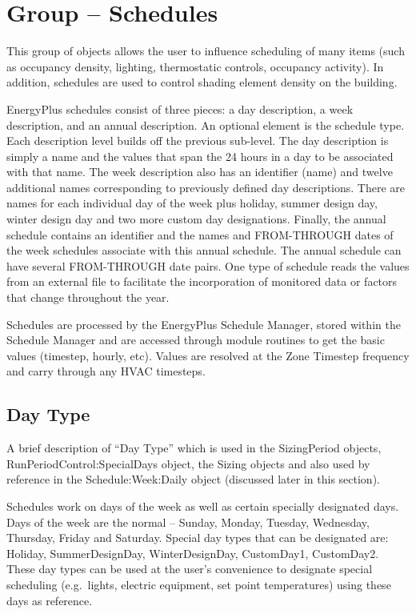 \section{Group -- Schedules}\label{group-schedules}

This group of objects allows the user to influence scheduling of many items (such as occupancy density, lighting, thermostatic controls, occupancy activity). In addition, schedules are used to control shading element density on the building.

EnergyPlus schedules consist of three pieces: a day description, a week description, and an annual description. An optional element is the schedule type. Each description level builds off the previous sub-level. The day description is simply a name and the values that span the 24 hours in a day to be associated with that name. The week description also has an identifier (name) and twelve additional names corresponding to previously defined day descriptions. There are names for each individual day of the week plus holiday, summer design day, winter design day and two more custom day designations. Finally, the annual schedule contains an identifier and the names and FROM-THROUGH dates of the week schedules associate with this annual schedule. The annual schedule can have several FROM-THROUGH date pairs. One type of schedule reads the values from an external file to facilitate the incorporation of monitored data or factors that change throughout the year.

Schedules are processed by the EnergyPlus Schedule Manager, stored within the Schedule Manager and are accessed through module routines to get the basic values (timestep, hourly, etc). Values are resolved at the Zone Timestep frequency and carry through any HVAC timesteps.

\subsection{Day Type}\label{day-type}

A brief description of ``Day Type'' which is used in the SizingPeriod objects, RunPeriodControl:SpecialDays object, the Sizing objects and also used by reference in the Schedule:Week:Daily object (discussed later in this section).

Schedules work on days of the week as well as certain specially designated days. Days of the week are the normal -- Sunday, Monday, Tuesday, Wednesday, Thursday, Friday and Saturday. Special day types that can be designated are: Holiday, SummerDesignDay, WinterDesignDay, CustomDay1, CustomDay2. These day types can be used at the user's convenience to designate special scheduling (e.g.~lights, electric equipment, set point temperatures) using these days as reference.

